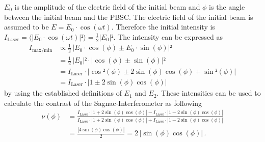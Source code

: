  $E_0$ is the amplitude of the electric field of the initial beam and $\phi$ is the angle between the initial beam and the PBSC. 
 The electric field of the initial beam is assumed to be $E = E_0 \cdot \cos(\omega t)$. Therefore the initial intensity is
 $I_{\text{Laser}} = \langle |E_0 \cdot \cos(\omega t)|² \rangle = \frac{1}{2} |E_0|²$.
 The intensity can be expressed as 
 \begin{align*}
    I_{\text{max/min}} &\propto \frac{1}{2} \, |E_0 \cdot \cos(\phi) \pm E_0 \cdot \sin(\phi)|² \\
    &= \frac{1}{2} \,|E_0|² \cdot |\cos(\phi) \pm \sin(\phi)|² \\
    &= I_{\text{Laser}}  \cdot |\cos²(\phi) \pm 2\sin(\phi)\cos(\phi) + \sin²(\phi)| \\
    &= I_{\text{Laser}}  \cdot |1 \pm 2\sin(\phi)\cos(\phi)|
 \end{align*}
 by using the established definitions of $E_1$ and $E_2$. 
 These intensities can be used to calculate the contrast of the Sagnac-Interferometer as following 
 \begin{align}
    \nu(\phi) &= \frac{I_{\text{Laser}}  \cdot |1 + 2\sin(\phi)\cos(\phi)|- I_{\text{Laser}}  \cdot |1 - 2\sin(\phi)\cos(\phi)|}{I_{\text{Laser}}  \cdot |1 + 2\sin(\phi)\cos(\phi)|+ I_{\text{Laser}}  \cdot |1 - 2\sin(\phi)\cos(\phi)|} \\
    &= \frac{|4 \sin(\phi)\cos(\phi)|}{2} = 2 \, |\sin(\phi)\cos(\phi)| \, .
    \label{eqn:contrast_Sagnac}
 \end{align}

